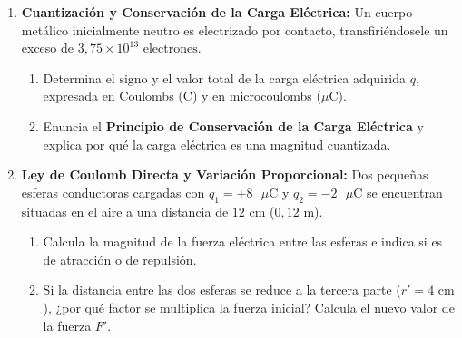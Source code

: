 \documentclass[11pt, letterpaper]{article}
\newif\ifshowanswers
\newcommand{\answer}[1]{ 
	\ifshowanswers 
	\par\vspace{0.15cm} 
	\begin{tcolorbox}[colback=blue!5!white, colframe=blue!60!white, arc=1mm, boxrule=0.5pt, title=\textbf{\footnotesize SOLUCIÓN PASO A PASO (DOCENTE)}] 
		\color{blue!80!black}\footnotesize #1 
	\end{tcolorbox} 
	\par\vspace{0.15cm} 
	\else 
	\par\vspace{0.3cm} 
	\fi 
}
\begin{document}
\begin{enumerate}[leftmargin=*, itemsep=0.8cm]
		\item \textbf{ Cuantización y Conservación de la Carga Eléctrica:} 
		Un cuerpo metálico inicialmente neutro es electrizado por contacto, transfiriéndosele un exceso de $3,75 \times 10^{13}\text{ electrones}$. 
		\begin{enumerate}[label=\alph*), itemsep=0.2cm] 
			\item Determina el signo y el valor total de la carga eléctrica adquirida $q$, expresada en Coulombs ($\text{C}$) y en microcoulombs ($\mu\text{C}$). 
			\item Enuncia el \textbf{Principio de Conservación de la Carga Eléctrica} y explica por qué la carga eléctrica es una magnitud cuantizada. 
		\end{enumerate} 
		\answer{ 
			\textbf{a) Cálculo de la carga total:} 
			Como gana electrones, la carga adquirida es negativa: 
			\[ q = - n \cdot e = -(3,75 \times 10^{13}) \cdot (1,6 \times 10^{-19}\text{ C}) = \mathbf{-6,0 \times 10^{-6}\text{ C}} = \mathbf{-6,0\text{ }\mu\text{C}} \] 
			\textbf{b) Conservación y cuantización:} 
			El principio de conservación establece que en todo sistema aislado la carga eléctrica total permanece constante (no se crea ni se destruye, solo se transfiere). Se dice que la carga está cuantizada porque cualquier carga libre $q$ en la naturaleza siempre es un múltiplo entero de la carga elemental $e$ ($q = n \cdot e$). 
		} 
		
		\item \textbf{ Ley de Coulomb Directa y Variación Proporcional:} 
		Dos pequeñas esferas conductoras cargadas con $q_1 = +8\text{ }\mu\text{C}$ y $q_2 = -2\text{ }\mu\text{C}$ se encuentran situadas en el aire a una distancia de $12\text{ cm}$ ($0,12\text{ m}$). 
		\begin{enumerate}[label=\alph*), itemsep=0.2cm] 
			\item Calcula la magnitud de la fuerza eléctrica entre las esferas e indica si es de atracción o de repulsión. 
			\item Si la distancia entre las dos esferas se reduce a la tercera parte ($r' = 4\text{ cm}$), ¿por qué factor se multiplica la fuerza inicial? Calcula el nuevo valor de la fuerza $F'$. 
		\end{enumerate} 
		\answer{ 
			\textbf{a) Magnitud de la fuerza inicial:} 
			\[ F = k \frac{|q_1 \cdot q_2|}{r^2} = (9 \times 10^9\text{ N}\cdot\text{m}^2/\text{C}^2) \cdot \frac{(8 \times 10^{-6}\text{ C}) \cdot (2 \times 10^{-6}\text{ C})}{(0,12\text{ m})^2} \] 
			\[ F = (9 \times 10^9) \cdot \frac{1,6 \times 10^{-11}}{0,0144} = \mathbf{10,0\text{ N}} \quad \text{(\textbf{Fuerza de Atracción}, pues tienen signos opuestos)} \] 
			\textbf{b) Cambio proporcional con la distancia:} 
			Dado que $F \propto \frac{1}{r^2}$, al reducir la distancia a la tercera parte ($r' = r/3$), la fuerza se multiplica por un factor de $3^2 = 9$. 
			\[ F' = 9 \cdot F = 9 \cdot (10,0\text{ N}) = \mathbf{90,0\text{ N}} \] 
		} 
		

\end{enumerate}
\end{document}
